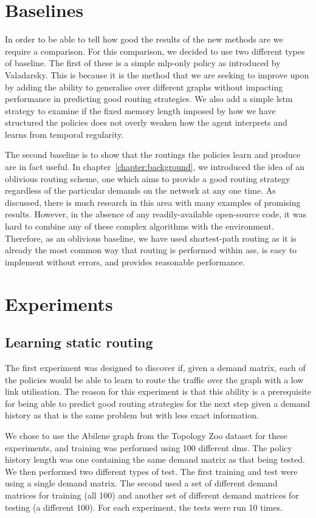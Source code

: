 \section{Baselines}
In order to be able to tell how good the results of the new methods are we require a comparison. For this comparison, we decided to use two different types of baseline. The first of these is a simple \ac{mlp}-only policy as introduced by Valadarsky. This is because it is the method that we are seeking to improve upon by adding the ability to generalise over different graphs without impacting performance in predicting good routing strategies. We also add a simple \ac{lstm} strategy to examine if the fixed memory length imposed by how we have structured the policies does not overly weaken how the agent interprets and learns from temporal regularity.

The second baseline is to show that the routings the policies learn and produce are in fact useful. In chapter~\ref{chapter:background}, we introduced the idea of an oblivious routing scheme, one which aims to provide a good routing strategy regardless of the particular demands on the network at any one time. As discussed, there is much research in this area with many examples of promising results. However, in the absence of any readily-available open-source code, it was hard to combine any of these complex algorithms with the environment. Therefore, as an oblivious baseline, we have used shortest-path routing as it is already the most common way that routing is performed within \acp{as}, is easy to implement without errors, and provides reasonable performance.

\section{Experiments}

\subsection{Learning static routing}
\label{section:exp_static}
The first experiment was designed to discover if, given a demand matrix, each of the policies would be able to learn to route the traffic over the graph with a low link utilisation. The reason for this experiment is that this ability is a prerequisite for being able to predict good routing strategies for the next step given a demand history as that is the same problem but with less exact information.

We chose to use the Abilene graph from the Topology Zoo dataset for these experiments, and training was performed using 100 different \acp{dm}. The policy history length was one containing the same demand matrix as that being tested. We then performed two different types of test. The first training and test were using a single demand matrix. The second used a set of different demand matrices for training (all 100) and another set of different demand matrices for testing (a different 100). For each experiment, the tests were run 10 times.

